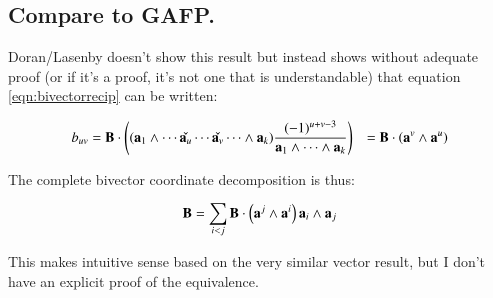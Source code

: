 \documentclass{article}      %
\begin{document}
\subsection{ Compare to GAFP. }

Doran/Lasenby doesn't show this result but instead shows without adequate proof (or if it's a proof, it's not
one that is understandable)
that 
equation \ref{eqn:bivectorrecip} can be written:

\begin{align*}
b_{uv}
&= 
\mathbf{B} \cdot
\left(
(\mathbf{a}_1 \wedge \cdots \check{\mathbf{a}_u} \cdots \check{\mathbf{a}_v} \cdots \wedge \mathbf{a}_k)
\frac{(-1)^{u+v-3}}
{\mathbf{a}_1 \wedge \cdots \wedge \mathbf{a}_k}
\right)
&=
\mathbf{B} \cdot \left(\mathbf{a}^v \wedge \mathbf{a}^u\right) \\
\end{align*}

The complete bivector coordinate decomposition is thus:

\begin{equation}
\mathbf{B} = \sum_{i<j} \mathbf{B} \cdot \left(\mathbf{a}^j \wedge \mathbf{a}^i\right) \mathbf{a}_i \wedge \mathbf{a}_j
\end{equation}

This makes intuitive sense based on the very similar vector result, but I don't have an explicit proof of the equivalence.
\end{document}
